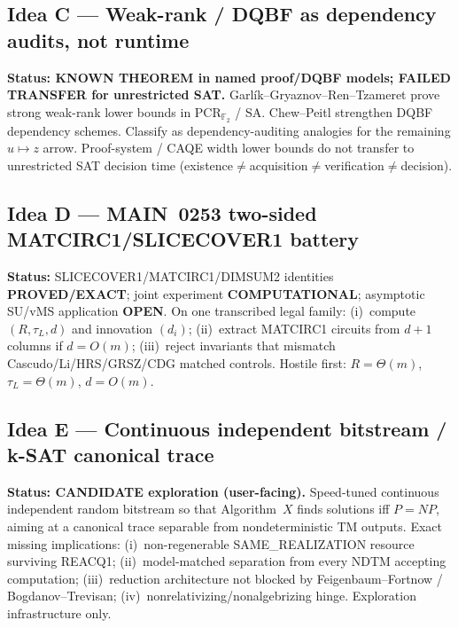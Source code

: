 \documentclass[11pt]{article}
\begin{document}
\subsection*{Idea C --- Weak-rank / DQBF as dependency audits, not runtime}
\textbf{Status: KNOWN THEOREM in named proof/DQBF models; FAILED TRANSFER for unrestricted SAT.}
Garl\'ik--Gryaznov--Ren--Tzameret prove strong weak-rank lower bounds in PCR$_{\mathbb F_2}$ / SA.
Chew--Peitl strengthen DQBF dependency schemes. Classify as dependency-auditing analogies for the
remaining $u\mapsto z$ arrow. Proof-system / CAQE width lower bounds do not transfer to
unrestricted SAT decision time (existence$\neq$acquisition$\neq$verification$\neq$decision).

\subsection*{Idea D --- MAIN~0253 two-sided MATCIRC1/SLICECOVER1 battery}
\textbf{Status:} SLICECOVER1/MATCIRC1/DIMSUM2 identities \textbf{PROVED/EXACT}; joint experiment
\textbf{COMPUTATIONAL}; asymptotic SU/vMS application \textbf{OPEN}.
On one transcribed legal family: (i)~compute $(R,\tau_L,d)$ and innovation $(d_i)$;
(ii)~extract MATCIRC1 circuits from $d+1$ columns if $d=O(m)$;
(iii)~reject invariants that mismatch Cascudo/Li/HRS/GRSZ/CDG matched controls.
Hostile first: $R=\Theta(m)$, $\tau_L=\Theta(m)$, $d=O(m)$.

\subsection*{Idea E --- Continuous independent bitstream / k-SAT canonical trace}
\textbf{Status: CANDIDATE exploration (user-facing).}
Speed-tuned continuous independent random bitstream so that Algorithm~$X$ finds solutions iff
$P=NP$, aiming at a canonical trace separable from nondeterministic TM outputs.
Exact missing implications: (i)~non-regenerable SAME\_REALIZATION resource surviving REACQ1;
(ii)~model-matched separation from every NDTM accepting computation;
(iii)~reduction architecture not blocked by Feigenbaum--Fortnow / Bogdanov--Trevisan;
(iv)~nonrelativizing/nonalgebrizing hinge. Exploration infrastructure only.
\end{document}
